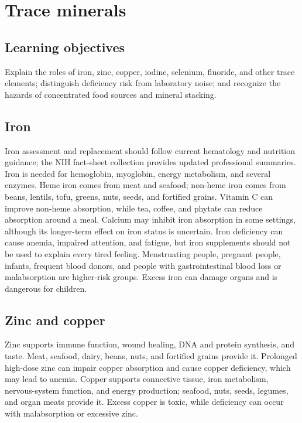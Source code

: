 \chapter{Trace minerals}

\section{Learning objectives}
Explain the roles of iron, zinc, copper, iodine, selenium, fluoride, and other trace elements; distinguish deficiency risk from laboratory noise; and recognize the hazards of concentrated food sources and mineral stacking.

\section{Iron}
Iron assessment and replacement should follow current hematology and nutrition guidance; the NIH fact-sheet collection provides updated professional summaries. \cite{odsList}
Iron is needed for hemoglobin, myoglobin, energy metabolism, and several enzymes. Heme iron comes from meat and seafood; non-heme iron comes from beans, lentils, tofu, greens, nuts, seeds, and fortified grains. Vitamin C can improve non-heme absorption, while tea, coffee, and phytate can reduce absorption around a meal. Calcium may inhibit iron absorption in some settings, although its longer-term effect on iron status is uncertain. Iron deficiency can cause anemia, impaired attention, and fatigue, but iron supplements should not be used to explain every tired feeling. Menstruating people, pregnant people, infants, frequent blood donors, and people with gastrointestinal blood loss or malabsorption are higher-risk groups. Excess iron can damage organs and is dangerous for children. \cite{odsIron}

\section{Zinc and copper}
Zinc supports immune function, wound healing, DNA and protein synthesis, and taste. Meat, seafood, dairy, beans, nuts, and fortified grains provide it. Prolonged high-dose zinc can impair copper absorption and cause copper deficiency, which may lead to anemia. Copper supports connective tissue, iron metabolism, nervous-system function, and energy production; seafood, nuts, seeds, legumes, and organ meats provide it. Excess copper is toxic, while deficiency can occur with malabsorption or excessive zinc. \cite{odsZinc,odsCopper}

